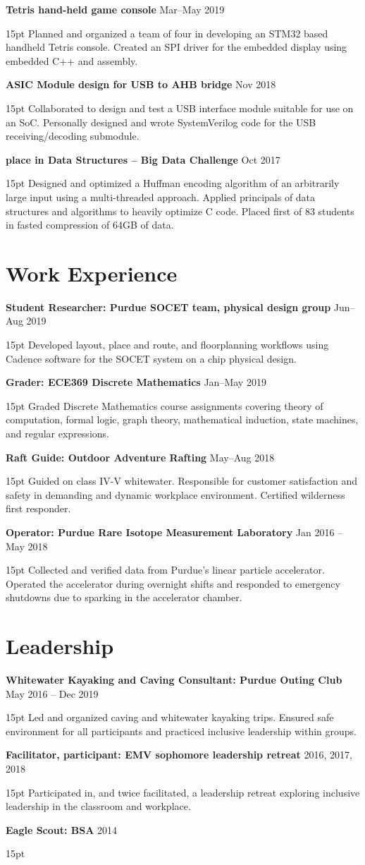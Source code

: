 \documentclass[10pt,letterpaper]{article}
\newcommand{\resumeItem}[3]{
	\textbf{#1} \hfill #2\\
	\begin{adjustwidth}{15pt}{}
	#3
	\end{adjustwidth}
}
\begin{document}
\resumeItem
{Tetris hand-held game console}
{Mar--May 2019}
{Planned and organized a team of four in developing an STM32 based handheld Tetris console. Created an SPI driver for the embedded display using embedded C++ and assembly.}

\resumeItem
{ASIC Module design for USB to AHB bridge}
{Nov 2018}
{Collaborated to design and test a USB interface module suitable for use on an SoC. Personally designed and wrote SystemVerilog code for the USB receiving/decoding submodule.}


\resumeItem
{ place in Data Structures -- Big Data Challenge}
{Oct 2017}
{Designed and optimized a Huffman encoding algorithm of an arbitrarily large input using a multi-threaded approach. Applied principals of data structures and algorithms to heavily optimize C code. Placed first of 83 students in fasted compression of 64GB of data.}


\section*{Work Experience}
\resumeItem
{Student Researcher: Purdue SOCET team, physical design group}
{Jun--Aug 2019}
{Developed layout, place and route, and floorplanning workflows using Cadence software for the SOCET system on a chip physical design.}

\resumeItem
{Grader: ECE369 Discrete Mathematics}
{Jan--May 2019}
{Graded Discrete Mathematics course assignments covering theory of computation, formal logic, graph theory, mathematical induction, state machines, and regular expressions.}

\resumeItem
{Raft Guide: Outdoor Adventure Rafting}
{May--Aug 2018}
{Guided on class IV-V whitewater. Responsible for customer satisfaction and safety in demanding and dynamic workplace environment. Certified wilderness first responder.}

\resumeItem
{Operator: Purdue Rare Isotope Measurement Laboratory}
{Jan 2016 -- May 2018}
{Collected and verified data from Purdue's linear particle accelerator. Operated the accelerator during overnight shifts and responded to emergency shutdowns due to sparking in the accelerator chamber.}


\section*{Leadership}
\resumeItem
{Whitewater Kayaking and Caving Consultant: Purdue Outing Club}
{May 2016 -- Dec 2019}
{Led and organized caving and whitewater kayaking trips. Ensured safe environment for all participants and practiced inclusive leadership within groups.}

\resumeItem
{Facilitator, participant: EMV sophomore leadership retreat}
{2016, 2017, 2018}
{Participated in, and twice facilitated, a leadership retreat exploring inclusive leadership in the classroom and workplace.}

\resumeItem
{Eagle Scout: BSA}
{2014}
{}
\end{document}
